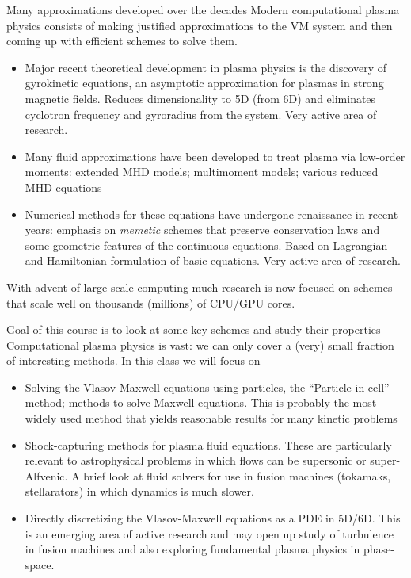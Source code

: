 \documentclass[pdf]{beamer}
\theoremstyle{definition}
\begin{document}
\begin{frame}{Many approximations developed over the decades}
  \small%
  Modern computational plasma physics consists of making justified
  approximations to the VM system and then coming up with efficient
  schemes to solve them.
  \begin{itemize}
  \item Major recent theoretical development in plasma physics is the
    discovery of gyrokinetic equations, an asymptotic approximation
    for plasmas in strong magnetic fields. Reduces dimensionality to
    5D (from 6D) and eliminates cyclotron frequency and gyroradius
    from the system. Very active area of research.
  \item Many fluid approximations have been developed to treat plasma
    via low-order moments: extended MHD models; multimoment models;
    various reduced MHD equations
  \item Numerical methods for these equations have undergone
    renaissance in recent years: emphasis on \emph{memetic} schemes
    that preserve conservation laws and some geometric features of the
    continuous equations. Based on Lagrangian and Hamiltonian
    formulation of basic equations. Very active area of research.
  \end{itemize}
  With advent of large scale computing much research is now focused on
  schemes that scale well on thousands (millions) of CPU/GPU cores.
\end{frame}

\begin{frame}{Goal of this course is to look at some key schemes and
    study their properties}
  \small%
  Computational plasma physics is vast: we can only cover a (very)
  small fraction of interesting methods. In this class we will focus
  on
  \begin{itemize}
  \item Solving the Vlasov-Maxwell equations using particles, the
    ``Particle-in-cell'' method; methods to solve Maxwell
    equations. This is probably the most widely used method that
    yields reasonable results for many kinetic problems
  \item Shock-capturing methods for plasma fluid equations. These are
    particularly relevant to astrophysical problems in which flows can
    be supersonic or super-Alfvenic. A brief look at fluid solvers for
    use in fusion machines (tokamaks, stellarators) in which dynamics
    is much slower.
  \item Directly discretizing the Vlasov-Maxwell equations as a PDE in
    5D/6D. This is an emerging area of active research and may open up
    study of turbulence in fusion machines and also exploring
    fundamental plasma physics in phase-space.
  \end{itemize}
\end{frame}
\end{document}
